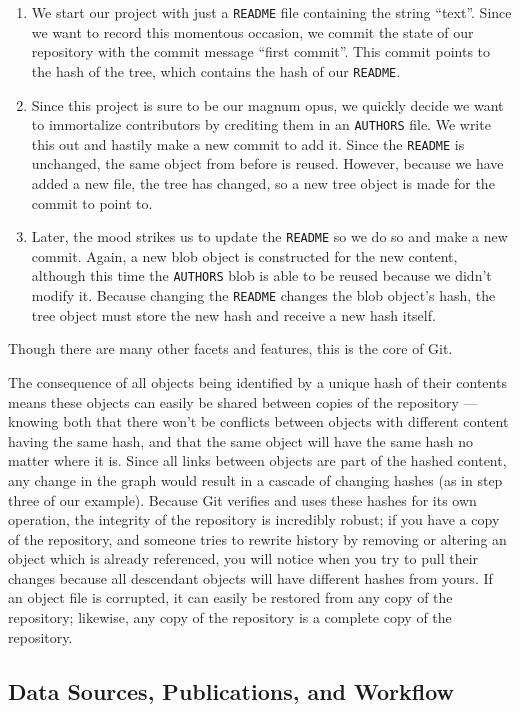 \documentclass[]{article}
\begin{document}
\begin{enumerate}
\item We start our project with just a \texttt{README} file containing the string “text”. Since we want to record this momentous occasion, we commit the state of our repository with the commit message “first commit”. This commit points to the hash of the tree, which contains the hash of our \texttt{README}.
\item Since this project is sure to be our magnum opus, we quickly decide we want to immortalize contributors by crediting them in an \texttt{AUTHORS} file. We write this out and hastily make a new commit to add it. Since the \texttt{README} is unchanged, the same object from before is reused. However, because we have added a new file, the tree has changed, so a new tree object is made for the commit to point to.
\item Later, the mood strikes us to update the \texttt{README} so we do so and make a new commit. Again, a new blob object is constructed for the new content, although this time the \texttt{AUTHORS} blob is able to be reused because we didn't modify it. Because changing the \texttt{README} changes the blob object's hash, the tree object must store the new hash and receive a new hash itself.
\end{enumerate}

Though there are many other facets and features, this is the core of Git.

The consequence of all objects being identified by a unique hash of their contents means these objects can easily be shared between copies of the repository — knowing both that there won't be conflicts between objects with different content having the same hash, and that the same object will have the same hash no matter where it is. Since all links between objects are part of the hashed content, any change in the graph would result in a cascade of changing hashes (as in step three of our example). Because Git verifies and uses these hashes for its own operation, the integrity of the repository is incredibly robust; if you have a copy of the repository, and someone tries to rewrite history by removing or altering an object which is already referenced, you will notice when you try to pull their changes because all descendant objects will have different hashes from yours. If an object file is corrupted, it can easily be restored from any copy of the repository; likewise, any copy of the repository is a complete copy of the repository.

\subsection*{Data Sources, Publications, and Workflow}
\end{document}
